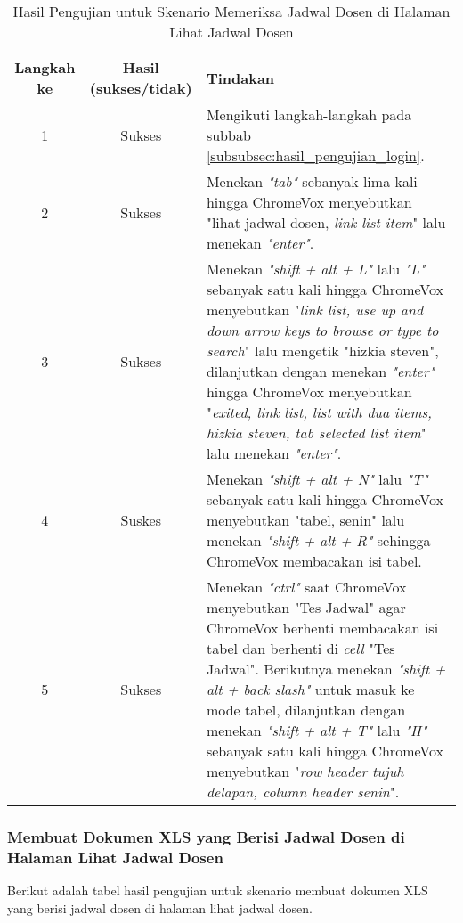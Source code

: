 \begin{table}[H]
    \centering 
    \caption{Hasil Pengujian untuk Skenario Memeriksa Jadwal Dosen di Halaman Lihat Jadwal Dosen}
    \label{tab:hasil_pengujian_memeriksa_jadwal_dosen_di_halaman_lihat_jadwal_dosen}
    \begin{tabular}{|c|c|p{10cm}|}
        \toprule
        Langkah ke & Hasil (sukses/tidak) & Tindakan \\

        \midrule
        1 & Sukses & Mengikuti langkah-langkah pada subbab \ref{subsubsec:hasil_pengujian_login}. \\
        2 & Sukses & Menekan \textit{"tab"} sebanyak lima kali hingga ChromeVox menyebutkan "lihat jadwal dosen, \textit{link list item}" lalu menekan \textit{"enter"}. \\
        3 & Sukses & Menekan \textit{"shift + alt + L"} lalu \textit{"L"} sebanyak satu kali hingga ChromeVox menyebutkan "\textit{link list, use up and down arrow keys to browse or type to search}" lalu mengetik "hizkia steven", dilanjutkan dengan menekan \textit{"enter"} hingga ChromeVox menyebutkan "\textit{exited, link list, list with dua items, hizkia steven, tab selected list item}" lalu menekan \textit{"enter"}. \\
        4 & Suskes & Menekan \textit{"shift + alt + N"} lalu \textit{"T"} sebanyak satu kali hingga ChromeVox menyebutkan "tabel, senin" lalu menekan \textit{"shift + alt + R"} sehingga ChromeVox membacakan isi tabel. \\
        5 & Sukses & Menekan \textit{"ctrl"} saat ChromeVox menyebutkan "Tes Jadwal" agar ChromeVox berhenti membacakan isi tabel dan berhenti di \textit{cell} "Tes Jadwal". Berikutnya menekan \textit{"shift + alt + back slash"} untuk masuk ke mode tabel, dilanjutkan dengan menekan \textit{"shift + alt + T"} lalu \textit{"H"} sebanyak satu kali hingga ChromeVox menyebutkan "\textit{row header tujuh delapan, column header senin}". \\

        \bottomrule

    \end{tabular}
\end{table}

\subsubsection{Membuat Dokumen XLS yang Berisi Jadwal Dosen di Halaman Lihat Jadwal Dosen}
\label{subsubsec:hasil_pengujian_membuat_dokumen_xls_yang_berisi_jadwal_dosen_di_halaman_lihat_jadwal_dosen}
Berikut adalah tabel hasil pengujian untuk skenario membuat dokumen XLS yang berisi jadwal dosen di halaman lihat jadwal dosen.

